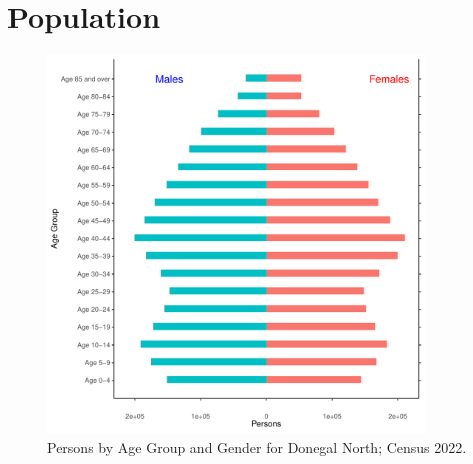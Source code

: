 \documentclass{article}
\begin{document}
\pagebreak

\section{Population} 
\label{sect:Pop}

\begin{figure}[h]
	\centering
	\includegraphics[width = 100mm]{../figures/PyramidPlot.pdf}
	\caption{Persons by Age Group and Gender for Donegal North; Census 2022.}
	\label{fig:2ae19629-1a6a-13a3-e055-000000000001}
	\end{figure}
\end{document}
